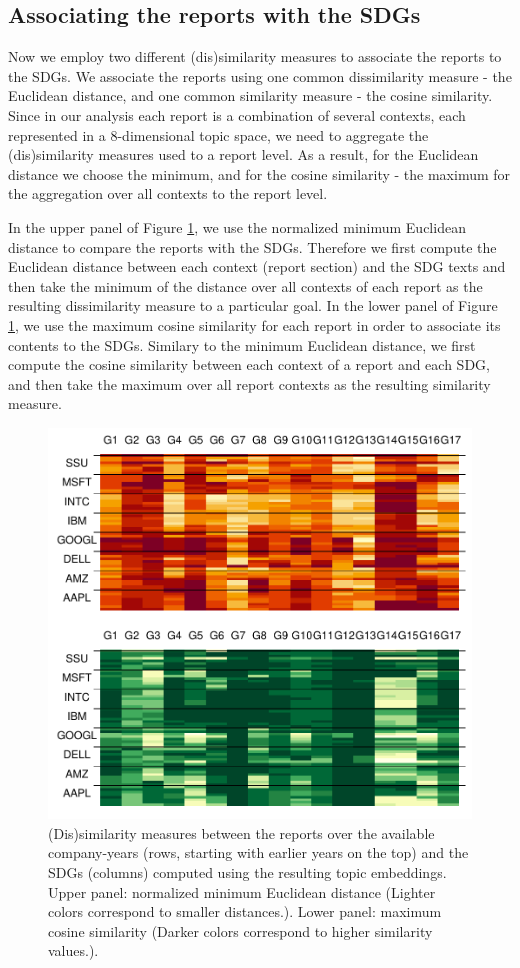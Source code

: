 \documentclass[
]{article}
\begin{document}
\hypertarget{associating-the-reports-with-the-sdgs}{%
\subsection{Associating the reports with the SDGs}\label{associating-the-reports-with-the-sdgs}}

Now we employ two different (dis)similarity measures to associate the reports to the SDGs. We associate the reports using one common dissimilarity measure - the Euclidean distance, and one common similarity measure - the cosine similarity. Since in our analysis each report is a combination of several contexts, each represented in a \(8\)-dimensional topic space, we need to aggregate the (dis)similarity measures used to a report level. As a result, for the Euclidean distance we choose the minimum, and for the cosine similarity - the maximum for the aggregation over all contexts to the report level.

In the upper panel of Figure \ref{fig:figcos}, we use the normalized minimum Euclidean distance to compare the reports with the SDGs. Therefore we first compute the Euclidean distance between each context (report section) and the SDG texts and then take the minimum of the distance over all contexts of each report as the resulting dissimilarity measure to a particular goal. In the lower panel of Figure \ref{fig:figcos}, we use the maximum cosine similarity for each report in order to associate its contents to the SDGs. Similary to the minimum Euclidean distance, we first compute the cosine similarity between each context of a report and each SDG, and then take the maximum over all report contexts as the resulting similarity measure.

\begin{figure}
\includegraphics[width=0.8\linewidth]{20240314_sustain_dim_files/figure-latex/figcos-1} \caption{(Dis)similarity measures between the reports over the available company-years (rows, starting with earlier years on the top) and the SDGs (columns) computed using the resulting topic embeddings.  Upper panel: normalized minimum Euclidean distance (Lighter colors correspond to smaller distances.). Lower panel: maximum cosine similarity (Darker colors correspond to higher similarity values.).}\label{fig:figcos}
\end{figure}
\end{document}
